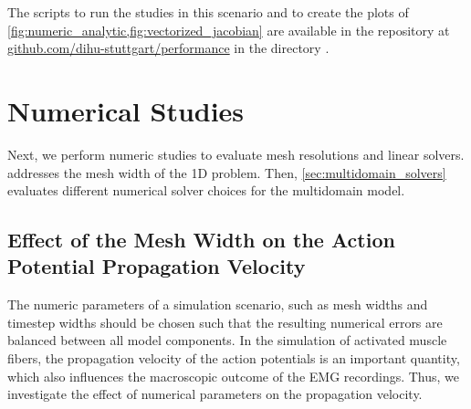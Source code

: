 \begin{reproduce_no_break}
  The scripts to run the studies in this scenario and to create the plots of \cref{fig:numeric_analytic,fig:vectorized_jacobian} are available in the repository at \href{https://github.com/dihu-stuttgart/performance}{github.com/dihu-stuttgart/performance}
  in the directory .
\end{reproduce_no_break}

\section{Numerical Studies}

Next, we perform numeric studies to evaluate mesh resolutions and linear solvers. 
 addresses the mesh width of the 1D problem. Then, \cref{sec:multidomain_solvers} evaluates different numerical solver choices for the multidomain model.

\subsection{Effect of the Mesh Width on the Action Potential Propagation Velocity}\label{sec:action_potential_velocity}

The numeric parameters of a simulation scenario, such as mesh widths and timestep widths should be chosen such that the resulting numerical errors are balanced between all model components. In the simulation of activated muscle fibers, the propagation velocity of the action potentials is an important quantity, which also influences the macroscopic outcome of the EMG recordings. Thus, we investigate the effect of numerical parameters on the propagation velocity.


